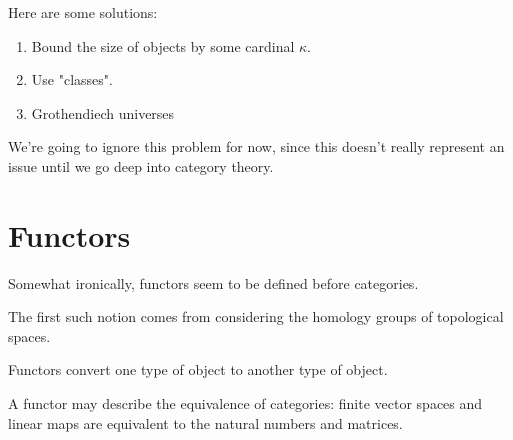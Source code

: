 \documentclass{article}
\theoremstyle{definition}
\begin{document}
Here are some solutions:

\begin{enumerate}
    \item Bound the size of objects by some cardinal $\kappa$.
    \item Use "classes".
    \item Grothendiech universes
\end{enumerate}

We're going to ignore this problem for now, since this doesn't
really represent an issue until we go deep into category theory.



\newpage

\section{Functors}

Somewhat ironically, functors seem to be defined before categories.

The first such notion comes from considering the homology
groups of topological spaces.

Functors convert one type of object to another type of object.

A functor may describe the equivalence of categories: finite vector spaces and linear
maps are equivalent to the natural numbers and matrices.
\end{document}
